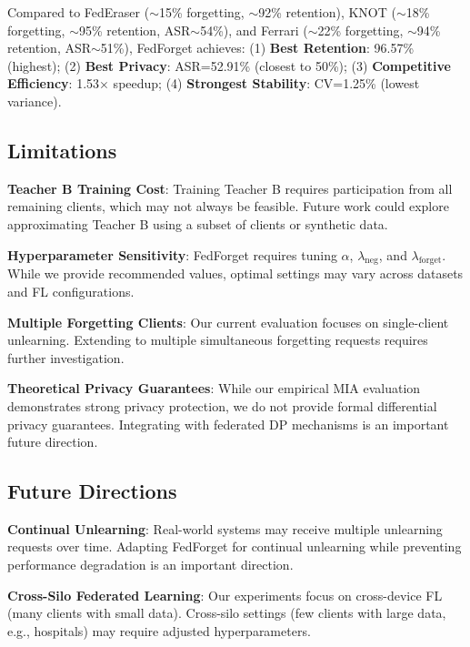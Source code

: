 \documentclass[10pt,twocolumn]{article}
\begin{document}
Compared to FedEraser \cite{liu2021federaser} ($\sim$15\% forgetting, $\sim$92\% retention), KNOT \cite{wu2023federated} ($\sim$18\% forgetting, $\sim$95\% retention, ASR$\sim$54\%), and Ferrari \cite{ferrari2024efficient} ($\sim$22\% forgetting, $\sim$94\% retention, ASR$\sim$51\%), FedForget achieves: (1) \textbf{Best Retention}: 96.57\% (highest); (2) \textbf{Best Privacy}: ASR=52.91\% (closest to 50\%); (3) \textbf{Competitive Efficiency}: 1.53$\times$ speedup; (4) \textbf{Strongest Stability}: CV=1.25\% (lowest variance).

\subsection{Limitations}

\textbf{Teacher B Training Cost}: Training Teacher B requires participation from all remaining clients, which may not always be feasible. Future work could explore approximating Teacher B using a subset of clients or synthetic data.

\textbf{Hyperparameter Sensitivity}: FedForget requires tuning $\alpha$, $\lambda_{\text{neg}}$, and $\lambda_{\text{forget}}$. While we provide recommended values, optimal settings may vary across datasets and FL configurations.

\textbf{Multiple Forgetting Clients}: Our current evaluation focuses on single-client unlearning. Extending to multiple simultaneous forgetting requests requires further investigation.

\textbf{Theoretical Privacy Guarantees}: While our empirical MIA evaluation demonstrates strong privacy protection, we do not provide formal differential privacy guarantees. Integrating with federated DP mechanisms \cite{geyer2017differentially} is an important future direction.

\subsection{Future Directions}

\textbf{Continual Unlearning}: Real-world systems may receive multiple unlearning requests over time. Adapting FedForget for continual unlearning while preventing performance degradation is an important direction.

\textbf{Cross-Silo Federated Learning}: Our experiments focus on cross-device FL (many clients with small data). Cross-silo settings (few clients with large data, e.g., hospitals) may require adjusted hyperparameters.
\end{document}
